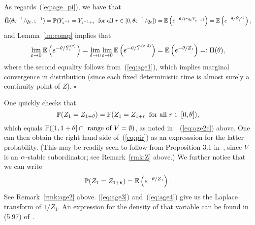 As regards~(\ref{eq:age_pi}), we have that
\begin{equation}
\label{eq:hpe}
\bar \Pi(\theta\eps^{-1}/q_\eps,\eps^{-1})=\P(Y_{\eps^{-1}}=Y_{\eps^{-1}+r}\,\mbox{ for all }r\in[0,\theta\eps^{-1}/q_\eps])
=\esp\left(e^{-\theta/(\eps q_\eps Y_{\eps^{-1}})}\right)=\esp\left(e^{-\theta/\hye_1}\right),
\end{equation}
and Lemma~\ref{lm:comp} implies that
\begin{equation}
\label{eq:h2}
\lim_{\eps\to0}\esp\left(e^{-\theta/\hye_1}\right)=\lim_{\d\to0}\lim_{\eps\to0}\esp\left(e^{-\theta/\vyed_1}\right)
=\esp\left(e^{-\theta/Z_1}\right)=:\Pi(\theta),
\end{equation}
where the second equality follows from~(\ref{eq:age1}), which implies marginal convergence
in distribution (since each fixed
deterministic time is almost surely a continuity point of $Z$).
$\square$

\begin{rmk}
\label{rmk:age3}
 One quickly checks that
\begin{equation}
\label{eq:age3} 
\P(Z_1=Z_{1+\theta})=\P(Z_1=Z_{1+r}\,\mbox{ for all }r\in[0,\theta]),
\end{equation}
which equals $\P([1,1+\theta]\cap\mbox{ range of }V=\emptyset)$, as noted in~~(\ref{eq:age2c}) above.
One can then obtain the right hand side of~(\ref{eq:pir})
as an expresssion for the latter probability. (This may be readily seen to follow from Proposition 3.1 in~\cite{kn:B}, 
since $V$ is an $\a$-stable subordinator; see Remark~\ref{rmk:Z} above.)
We further notice that we can write
\begin{equation}
\label{eq:age4} 
\P(Z_1=Z_{1+\theta})=\esp\left(e^{-\theta/Z_1}\right).
\end{equation}
See Remark~\ref{rmk:age2} above.  (\ref{eq:age3}) and~(\ref{eq:age4}) give us the Laplace transform of $1/Z_1$. An expression for the density of
that variable can be found in (5.97) of~\cite{kn:FM}.
\end{rmk}



